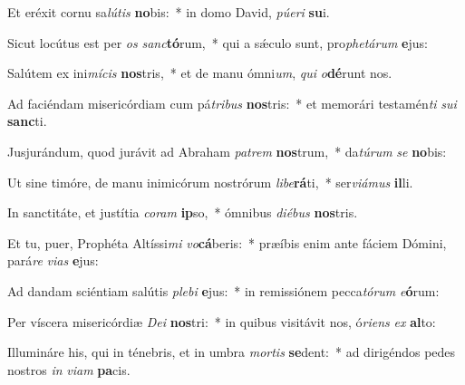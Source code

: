 \item Et eréxit cornu sa\textit{lú}\textit{tis} \textbf{no}bis:~* in domo David, \textit{pú}\textit{e}\textit{ri} \textbf{su}i.
\item Sicut locútus est per \textit{os} \textit{sanc}\textbf{tó}rum,~* qui a sǽculo sunt, pro\textit{phe}\textit{tá}\textit{rum} \textbf{e}jus:
\item Salútem ex ini\textit{mí}\textit{cis} \textbf{nos}tris,~* et de manu ómni\textit{um}, \textit{qui} \textit{o}\textbf{dé}runt nos.
\item Ad faciéndam misericórdiam cum pá\textit{tri}\textit{bus} \textbf{nos}tris:~* et memorári testamén\textit{ti} \textit{su}\textit{i} \textbf{sanc}ti.
\item Jusjurándum, quod jurávit ad Abraham \textit{pa}\textit{trem} \textbf{nos}trum,~* da\textit{tú}\textit{rum} \textit{se} \textbf{no}bis:
\item Ut sine timóre, de manu inimicórum nostrórum \textit{li}\textit{be}\textbf{rá}ti,~* ser\textit{vi}\textit{á}\textit{mus} \textbf{il}li.
\item In sanctitáte, et justítia \textit{co}\textit{ram} \textbf{ip}so,~* ómnibus \textit{di}\textit{é}\textit{bus} \textbf{nos}tris.
\item Et tu, puer, Prophéta Altíssi\textit{mi} \textit{vo}\textbf{cá}beris:~* præíbis enim ante fáciem Dómini, pará\textit{re} \textit{vi}\textit{as} \textbf{e}jus:
\item Ad dandam sciéntiam salútis \textit{ple}\textit{bi} \textbf{e}jus:~* in remissiónem pecca\textit{tó}\textit{rum} \textit{e}\textbf{ó}rum:
\item Per víscera misericórdiæ \textit{De}\textit{i} \textbf{nos}tri:~* in quibus visitávit nos, ó\textit{ri}\textit{ens} \textit{ex} \textbf{al}to:
\item Illumináre his, qui in ténebris, et in umbra \textit{mor}\textit{tis} \textbf{se}dent:~* ad dirigéndos pedes nostros \textit{in} \textit{vi}\textit{am} \textbf{pa}cis.

